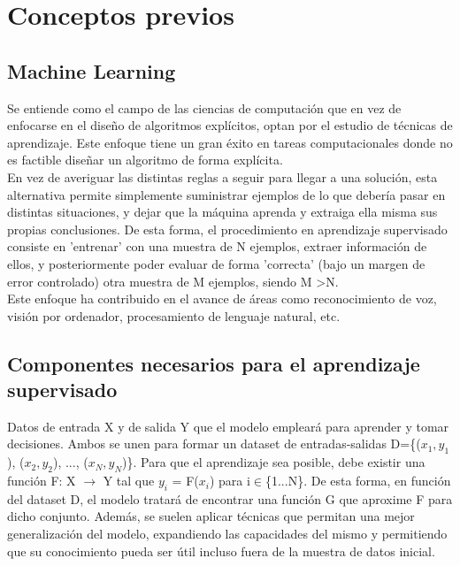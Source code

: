 \chapter{Conceptos previos}


\section{Machine Learning}

Se entiende como el campo de las ciencias de computación que en vez de enfocarse en el diseño de algoritmos explícitos, optan por el estudio de técnicas de aprendizaje. Este enfoque tiene un gran éxito en tareas computacionales donde no es factible diseñar un algoritmo de forma explícita. \cite{Programming_Massively} \\
En vez de averiguar las distintas reglas a seguir para llegar a una solución, esta alternativa permite simplemente suministrar ejemplos de lo que debería pasar en distintas situaciones, y dejar que la máquina aprenda y extraiga ella misma sus propias conclusiones. De esta forma, el procedimiento en aprendizaje supervisado consiste en 'entrenar' con una muestra de N ejemplos, extraer información de ellos, y posteriormente poder evaluar de forma 'correcta' (bajo un margen de error controlado) otra muestra de M ejemplos, siendo M \textgreater N. \cite{Learning_From_Data} \\
Este enfoque ha contribuido en el avance de áreas como reconocimiento de voz, visión por ordenador, procesamiento de lenguaje natural, etc.

\section{Componentes necesarios para el aprendizaje supervisado}

Datos de entrada X y de salida Y que el modelo empleará para aprender y tomar decisiones. Ambos se unen para formar un dataset de entradas-salidas D=\{($x_1, y_1$), ($x_2, y_2$), ..., ($x_N, y_N$)\}. Para que el aprendizaje sea posible, debe existir una función F: X $\rightarrow$ Y tal que $y_i$ = F($x_i$) para i$\in$\{1...N\}. De esta forma, en función del dataset D, el modelo tratará de encontrar una función G que aproxime F para dicho conjunto. Además, se suelen aplicar técnicas que permitan una mejor generalización del modelo, expandiendo las capacidades del mismo y permitiendo que su conocimiento pueda ser útil incluso fuera de la muestra de datos inicial. \cite{Learning_From_Data}

